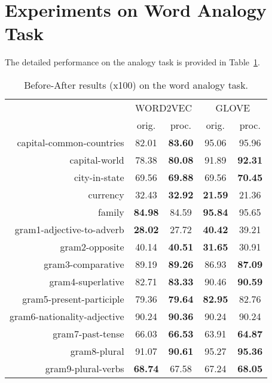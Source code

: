 \documentclass{article} \usepackage{acl2017,times}
\begin{document}
 
 \section{Experiments on Word Analogy Task}
\label{app:analogy}

The detailed performance on the analogy task is provided in Table~\ref{tb:analogy:detail}.

\begin{table}[thbp]
\centering
\begin{tabular}{|r||c|c||c|c|}
\hline
\multirow{2}{*}{}           & \multicolumn{2}{c||}{WORD2VEC}       & \multicolumn{2}{c|}{GLOVE}      \\ \cline{2-5} 
                            & orig.            & proc.            & orig.          & proc.          \\ \hline
capital-common-countries    & 82.01            & \textbf{83.60}   & 95.06          & 95.96          \\ \hline
capital-world               & 78.38            & \textbf{80.08}   & 91.89          & \textbf{92.31} \\ \hline
city-in-state               & 69.56            & \textbf{69.88}   & 69.56          & \textbf{70.45} \\ \hline
currency                    & 32.43            & \textbf{32.92} & \textbf{21.59} & 21.36          \\ \hline
family                      & \textbf{84.98} & 84.59            & \textbf{95.84} & 95.65          \\ \hline
gram1-adjective-to-adverb   & \textbf{28.02} & 27.72            & \textbf{40.42} & 39.21          \\ \hline
gram2-opposite              & 40.14            & \textbf{40.51} & \textbf{31.65} & 30.91          \\ \hline
gram3-comparative           & 89.19            & \textbf{89.26} & 86.93          & \textbf{87.09} \\ \hline
gram4-superlative           & 82.71            & \textbf{83.33} & 90.46          & \textbf{90.59} \\ \hline
gram5-present-participle    & 79.36            & \textbf{79.64} & \textbf{82.95} & 82.76          \\ \hline
gram6-nationality-adjective & 90.24            & \textbf{90.36} & 90.24          & 90.24          \\ \hline
gram7-past-tense            & 66.03            & \textbf{66.53} & 63.91          & \textbf{64.87} \\ \hline
gram8-plural                & 91.07            & \textbf{90.61} & 95.27          & \textbf{95.36} \\ \hline
gram9-plural-verbs          & \textbf{68.74} & 67.58            & 67.24          & \textbf{68.05} \\ \hline
\end{tabular}
\caption{Before-After results (x100) on the word analogy task.}
\label{tb:analogy:detail}
\end{table}
\end{document}
